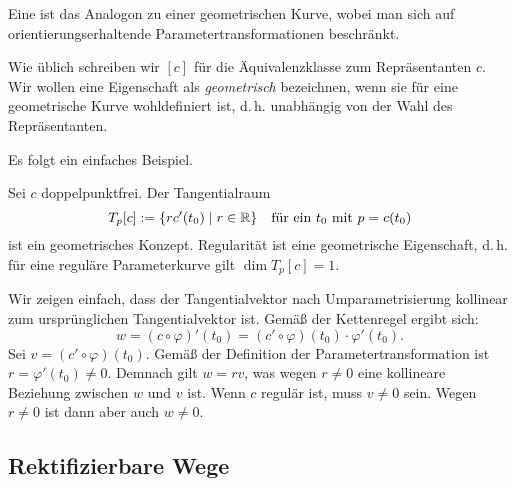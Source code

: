 \begin{definition}
Eine  ist das Analogon zu einer
geometrischen Kurve, wobei man sich auf orientierungserhaltende
Parametertransformationen beschränkt.
\end{definition}

\noindent
Wie üblich schreiben wir $[c]$ für die Äquivalenzklasse zum
Repräsentanten $c$. Wir wollen eine Eigenschaft als
\emph{geometrisch} bezeichnen, wenn sie für eine geometrische Kurve
wohldefiniert ist, d.\,h. unabhängig von der Wahl des Repräsentanten.

Es folgt ein einfaches Beispiel.

\begin{corollary}
Sei $c$ doppelpunktfrei. Der Tangentialraum
\begin{equation}
T_p[c] := \{rc'(t_0)\mid r\in\mathbb R\}
\quad\text{für ein $t_0$ mit $p=c(t_0)$}
\end{equation}
ist ein geometrisches Konzept. Regularität ist eine geometrische
Eigenschaft, d.\,h. für eine reguläre Parameterkurve gilt
$\dim T_p[c]=1$.
\end{corollary}

\noindent{}
Wir zeigen einfach, dass der Tangentialvektor nach Umparametrisierung
kollinear zum ursprünglichen Tangentialvektor ist. Gemäß der
Kettenregel ergibt sich:%
\begin{equation}
w = (c\circ\varphi)'(t_0) = (c'\circ\varphi)(t_0)\cdot \varphi'(t_0).
\end{equation}
Sei $v=(c'\circ\varphi)(t_0)$. Gemäß der Definition der
Parametertransformation ist $r=\varphi'(t_0)\ne 0$. Demnach
gilt $w=rv$, was wegen $r\ne 0$ eine kollineare Beziehung zwischen
$w$ und $v$ ist. Wenn $c$ regulär ist, muss $v\ne 0$ sein.
Wegen $r\ne 0$ ist dann aber auch $w\ne 0$.\;\qedsymbol


\subsection{Rektifizierbare Wege}

